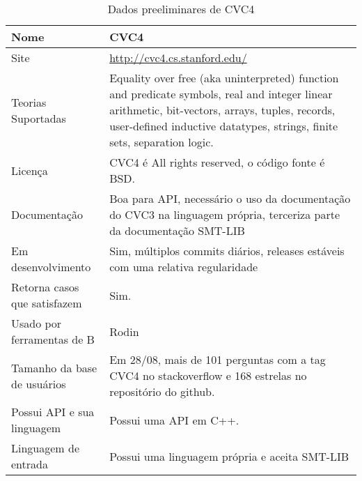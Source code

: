 \begin{table}[!h]
  \centering
  \begin{tabular}{ | l | p{10cm} |}
    \hline
	Nome & CVC4 \\ \hline
    Site & \url{http://cvc4.cs.stanford.edu/} \\ \hline 
    Teorias Suportadas & Equality over free (aka uninterpreted) function and predicate symbols, real and integer linear arithmetic, bit-vectors, arrays, tuples, records, user-defined inductive datatypes, strings, finite sets, separation logic.\\ \hline
    Licença & CVC4 é All rights reserved, o código fonte é BSD. \\ \hline
    Documentação & Boa para API, necessário o uso da documentação do CVC3 na linguagem própria, terceriza parte da documentação SMT-LIB \\ \hline
    Em desenvolvimento & Sim, múltiplos commits diários, releases estáveis com uma relativa regularidade \\ \hline
    Retorna casos que satisfazem & Sim. \\ \hline
    Usado por ferramentas de B & Rodin \\ \hline
    Tamanho da base de usuários & Em 28/08, mais de 101 perguntas com a tag CVC4 no stackoverflow e 168 estrelas no repositório do github. \\ \hline
    Possui API e sua linguagem & Possui uma API em C++. \\ \hline
    Linguagem de entrada & Possui uma linguagem própria e aceita SMT-LIB \\ \hline
  \end{tabular}
  \caption{Dados preeliminares de CVC4 }
  \label{tab:LABEL_TAB_3}
\end{table}